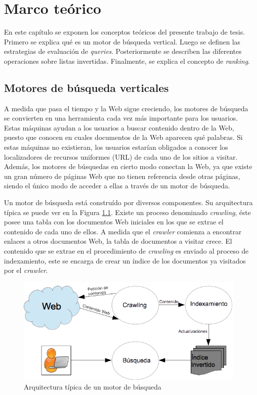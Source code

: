 \chapter{Marco te\'orico}
\label{cap:marco}
En este capítulo se exponen los conceptos teóricos del presente trabajo de tesis. Primero se explica qué es un motor de búsqueda vertical. Luego se definen las estrategias de evaluación de \textit{queries}. Posteriormente se describen las diferentes operaciones sobre listas invertidas. Finalmente, se explica el concepto de \textit{ranking}. 

\section{Motores de búsqueda verticales}
\label{marco:mbv}
A medida que pasa el tiempo y la Web sigue creciendo, los motores de búsqueda se convierten en una herramienta cada vez más importante para los usuarios. Estas máquinas ayudan a los usuarios a buscar contenido dentro de la Web, puesto que conocen en cuales documentos de la Web aparecen qué palabras. Si estas máquinas no existieran, los usuarios estarían obligados a conocer los localizadores de recursos uniformes (URL) de cada uno de los sitios a visitar. Además, los motores de búsquedas en cierto modo conectan la Web, ya que existe un gran número de páginas Web que no tienen referencia desde otras páginas, siendo el único modo de acceder a ellas a través de un motor de búsqueda.

Un motor de búsqueda está construído por diversos componentes. Su arquitectura típica se puede ver en la Figura \ref{fig:searchenginearchitecture}. Existe un proceso denominado \textit{crawling}, éste posee una tabla con los documentos Web iniciales en los que se extrae el contenido de cada uno de ellos. A medida que el \textit{crawler} comienza a encontrar enlaces a otros documentos Web, la tabla de documentos a visitar crece. El contenido que se extrae en el procedimiento de \textit{crawling} es enviado al proceso de indexamiento, este se encarga de crear un índice de los documentos ya visitados por el \textit{crawler}. 

\begin{figure}[tp]
\centering
\includegraphics[scale=.75]{images/searchenginearchitecture.png}
\caption{Arquitectura típica de un motor de búsqueda}
\label{fig:searchenginearchitecture}
\end{figure}

